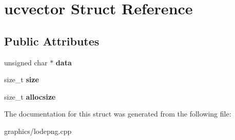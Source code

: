 \hypertarget{structucvector}{\section{ucvector Struct Reference}
\label{structucvector}
}
\subsection*{Public Attributes}
\begin{DoxyCompactItemize}
\item 
\hypertarget{structucvector_ace794c5713208c5a20f21762cd87c919}{unsigned char $\ast$ {\bfseries data}}\label{structucvector_ace794c5713208c5a20f21762cd87c919}

\item 
\hypertarget{structucvector_a27c99c34de0c5b3ca0c242d402c69499}{size\+\_\+t {\bfseries size}}\label{structucvector_a27c99c34de0c5b3ca0c242d402c69499}

\item 
\hypertarget{structucvector_a235168baac13f0c78bd3e309dc170f90}{size\+\_\+t {\bfseries allocsize}}\label{structucvector_a235168baac13f0c78bd3e309dc170f90}

\end{DoxyCompactItemize}


The documentation for this struct was generated from the following file\+:\begin{DoxyCompactItemize}
\item 
graphics/lodepng.\+cpp\end{DoxyCompactItemize}

